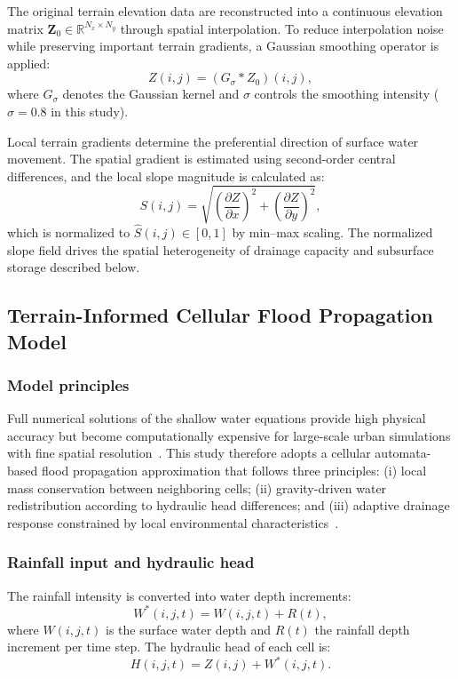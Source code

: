 \documentclass[preprint,12pt]{elsarticle}
\begin{document}
The original terrain elevation data are reconstructed into a continuous
elevation matrix $\mathbf{Z}_0 \in \mathbb{R}^{N_x\times N_y}$ through spatial
interpolation. To reduce interpolation noise while preserving important
terrain gradients, a Gaussian smoothing operator is applied:
\begin{equation}\label{eq:smooth}
Z(i,j) = (G_\sigma * Z_0)(i,j),
\end{equation}
where $G_\sigma$ denotes the Gaussian kernel and $\sigma$ controls the
smoothing intensity ($\sigma=0.8$ in this study).

Local terrain gradients determine the preferential direction of surface water
movement. The spatial gradient is estimated using second-order central
differences, and the local slope magnitude is calculated as:
\begin{equation}\label{eq:slope}
S(i,j) = \sqrt{\left(\frac{\partial Z}{\partial x}\right)^2 +
\left(\frac{\partial Z}{\partial y}\right)^2},
\end{equation}
which is normalized to $\hat{S}(i,j)\in[0,1]$ by min--max scaling. The
normalized slope field drives the spatial heterogeneity of drainage
capacity and subsurface storage described below.

\subsection{Terrain-Informed Cellular Flood Propagation Model}
\subsubsection{Model principles}
Full numerical solutions of the shallow water equations provide high physical
accuracy but become computationally expensive for large-scale urban
simulations with fine spatial resolution~\cite{bates2010simple}. This study
therefore adopts a cellular automata-based flood propagation approximation
that follows three principles: (i) local mass conservation between
neighboring cells; (ii) gravity-driven water redistribution according to
hydraulic head differences; and (iii) adaptive drainage response constrained
by local environmental characteristics~\cite{ghimire2013formulation,
guidolin2016weighted}.

\subsubsection{Rainfall input and hydraulic head}
The rainfall intensity is converted into water depth increments:
\begin{equation}\label{eq:rain}
W^{*}(i,j,t) = W(i,j,t) + R(t),
\end{equation}
where $W(i,j,t)$ is the surface water depth and $R(t)$ the rainfall depth
increment per time step. The hydraulic head of each cell is:
\begin{equation}\label{eq:head}
H(i,j,t) = Z(i,j) + W^{*}(i,j,t).
\end{equation}
\end{document}
